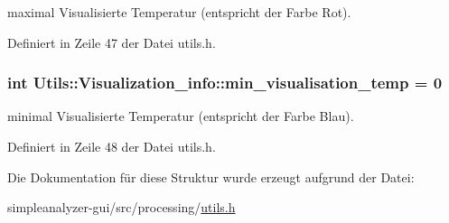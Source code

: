 maximal Visualisierte Temperatur (entspricht der Farbe Rot). 



Definiert in Zeile 47 der Datei utils.\-h.

\hypertarget{structUtils_1_1Visualization__info_a6e192352d1f00709f8ef963206ff2653}{
\subsubsection[{min\-\_\-visualisation\-\_\-temp}]{\setlength{\rightskip}{0pt plus 5cm}int Utils\-::\-Visualization\-\_\-info\-::min\-\_\-visualisation\-\_\-temp = 0}}\label{structUtils_1_1Visualization__info_a6e192352d1f00709f8ef963206ff2653}


minimal Visualisierte Temperatur (entspricht der Farbe Blau). 



Definiert in Zeile 48 der Datei utils.\-h.



Die Dokumentation für diese Struktur wurde erzeugt aufgrund der Datei\-:\begin{DoxyCompactItemize}
\item 
simpleanalyzer-\/gui/src/processing/\hyperlink{utils_8h}{utils.\-h}\end{DoxyCompactItemize}
